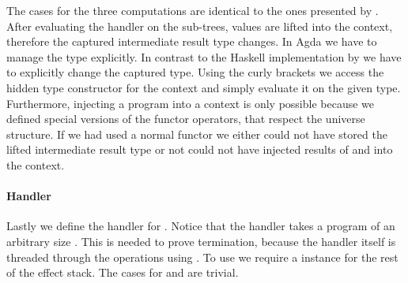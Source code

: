 The cases for the three computations are identical to the ones presented by
\citeauthor{DBLP:conf/haskell/WuSH14}.
After evaluating the handler on the sub-trees, values are lifted into the
context, therefore the captured intermediate result type changes.
In Agda we have to manage the type explicitly.
In contrast to the Haskell implementation by
\citeauthor{DBLP:conf/haskell/WuSH14} we have to explicitly change the captured
type.
Using the curly brackets we access the hidden type constructor 
for the context and simply evaluate it on the given type.
Furthermore, injecting a program into a context is only possible because we
defined special versions of the functor operators, that respect the universe
structure.
If we had used a normal functor we either could not have stored the lifted
intermediate result type or not could not have injected results of
 and  into the context.

\paragraph{Handler}
Lastly we define the handler for .
Notice that the handler takes a program of an arbitrary size
.
This is needed to prove termination, because the handler itself is threaded
through the  operations using
.
To use  we require a  instance for the
rest of the effect stack.
The cases for  and
 are trivial.

